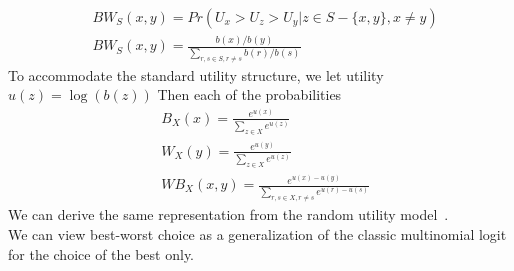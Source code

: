 \documentclass[nonblindrev]{informs3}
\begin{document}
\begin{align*}
&BW_S(x,y)=Pr(U_x>U_z>U_y | z \in S -\{x,y\}, x\neq y)\\
&BW_S(x,y)=\frac{b(x)/b(y)}{\sum_{r,s \in S, r \neq s}b(r)/b(s)}
\end{align*}
To accommodate the standard utility structure, we let utility $u(z)=\log{(b(z))}$ Then each of the probabilities 
\begin{align*}
&B_X(x)=\frac{e^{u(x)}}{\sum_{z \in X} e^{u(z)}}\\
&W_X(y)=\frac{e^{u(y)}}{\sum_{z \in X} e^{u(z)}}\\
&WB_X(x,y)=\frac{e^{u(x)-u(y)}}{\sum_{r,s \in X, r\neq s} e^{u(r)-u(s)}}
\end{align*}
We can derive the same representation from the random utility model~\cite{marley2005some}. \\
We can view best-worst choice as a generalization of the classic multinomial logit for the choice of the best only.\\
\end{document}
